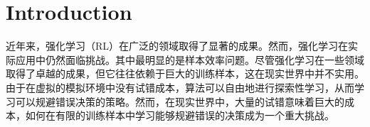 \section{Introduction}


近年来，强化学习（RL）在广泛的领域取得了显著的成果。然而，强化学习在实际应用中仍然面临挑战。其中最明显的是样本效率问题。尽管强化学习在一些领域取得了卓越的成果，但它往往依赖于巨大的训练样本，这在现实世界中并不实用。由于在虚拟的模拟环境中没有试错成本，算法可以自由地进行探索性学习，从而学习可以规避错误决策的策略。然而，在现实世界中，大量的试错意味着巨大的成本，如何在有限的训练样本中学习能够规避错误的决策成为一个重大挑战。


